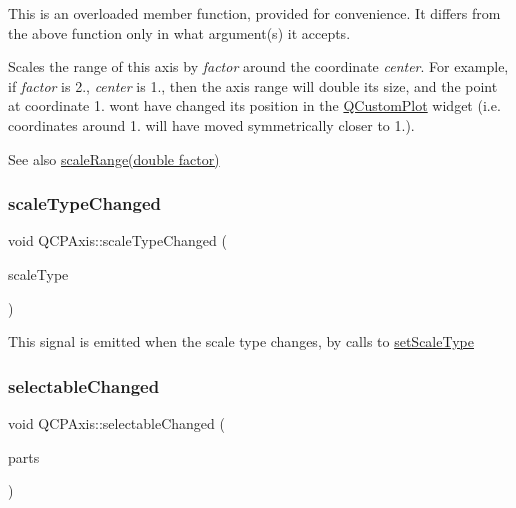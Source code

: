 This is an overloaded member function, provided for convenience. It differs from the above function only in what argument(s) it accepts.

Scales the range of this axis by {\itshape factor} around the coordinate {\itshape center}. For example, if {\itshape factor} is 2., {\itshape center} is 1., then the axis range will double its size, and the point at coordinate 1. won\textquotesingle{}t have changed its position in the \hyperlink{class_q_custom_plot}{Q\+Custom\+Plot} widget (i.\+e. coordinates around 1. will have moved symmetrically closer to 1.).

\begin{DoxySeeAlso}{See also}
\hyperlink{class_q_c_p_axis_a31d18ddf3a4f21ceb077db8ae5b69856}{scale\+Range(double factor)} 
\end{DoxySeeAlso}
\mbox{\label{class_q_c_p_axis_a3505ed8a93bd2e349d858d84996bf767}} 
\subsubsection{\texorpdfstring{scale\+Type\+Changed}{scaleTypeChanged}}
{\footnotesize\ttfamily void Q\+C\+P\+Axis\+::scale\+Type\+Changed (\begin{DoxyParamCaption}\item[{\hyperlink{class_q_c_p_axis_a36d8e8658dbaa179bf2aeb973db2d6f0}{Q\+C\+P\+Axis\+::\+Scale\+Type}}]{scale\+Type }\end{DoxyParamCaption})\hspace{0.3cm}{\ttfamily [signal]}}

This signal is emitted when the scale type changes, by calls to \hyperlink{class_q_c_p_axis_adef29cae617af4f519f6c40d1a866ca6}{set\+Scale\+Type} \mbox{\label{class_q_c_p_axis_aa5ff1fd851139028a3bb4efcb31de9fc}} 
\subsubsection{\texorpdfstring{selectable\+Changed}{selectableChanged}}
{\footnotesize\ttfamily void Q\+C\+P\+Axis\+::selectable\+Changed (\begin{DoxyParamCaption}\item[{const Q\+C\+P\+Axis\+::\+Selectable\+Parts \&}]{parts }\end{DoxyParamCaption})\hspace{0.3cm}{\ttfamily [signal]}}

